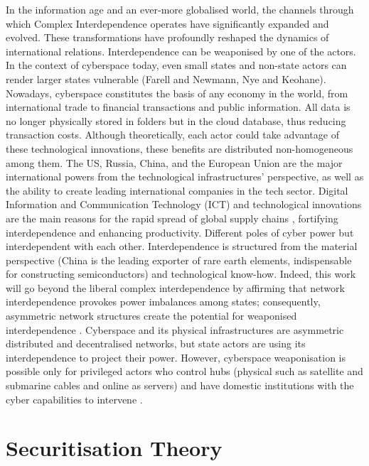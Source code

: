 In the information age and an ever-more globalised world, the channels through which Complex Interdependence operates have significantly expanded and evolved. These transformations have profoundly reshaped the dynamics of international relations. Interdependence can be weaponised by one of the actors. In the context of cyberspace today, even small states and non-state actors can render larger states vulnerable \parencite{farrell_2019_weaponized, nye_1971_transnational}(Farell and Newmann, Nye and Keohane). Nowadays, cyberspace constitutes the basis of any economy in the world, from international trade to financial transactions and public information. All data is no longer physically stored in folders but in the cloud database, thus reducing transaction costs. Although theoretically, each actor could take advantage of these technological innovations, these benefits are distributed non-homogeneous among them. The US, Russia, China, and the European Union are the major international powers from the technological infrastructures' perspective, as well as the ability to create leading international companies in the tech sector. Digital Information and Communication Technology (ICT) and technological innovations are the main reasons for the rapid spread of global supply chains \autocite{mansfield_2021_embedded}, fortifying interdependence and enhancing productivity. Different poles of cyber power but interdependent with each other. Interdependence is structured from the material perspective (China is the leading exporter of rare earth elements, indispensable for constructing semiconductors) and technological know-how. Indeed, this work will go beyond the liberal complex interdependence by affirming that network interdependence provokes power imbalances among states; consequently, asymmetric network structures create the potential for weaponised interdependence \autocite[45]{farrell_2019_weaponized}. Cyberspace and its physical infrastructures are asymmetric distributed and decentralised networks, but state actors are using its interdependence to project their power. However, cyberspace weaponisation is possible only for privileged actors who control hubs (physical such as satellite and submarine cables and online as servers) and have domestic institutions with the cyber capabilities to intervene \autocite{farrell_2019_weaponized}.

\section{Securitisation Theory}

